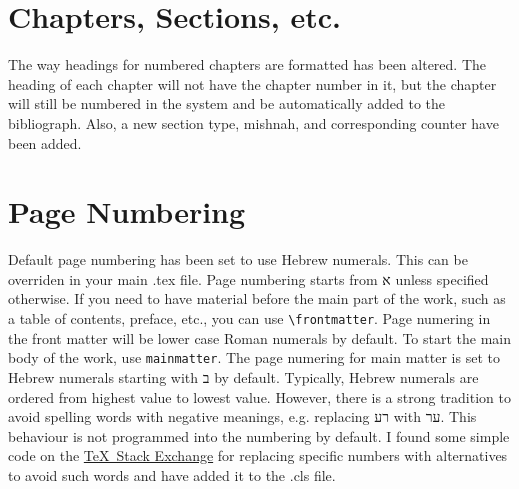 \documentclass[12pt]{article}
\begin{document}
	\section{Chapters, Sections, etc.}
	The way headings for numbered chapters are formatted has been altered. The heading of each chapter will not have the chapter number in it, but the chapter will still be numbered in the system and be automatically added to the bibliograph. Also, a new section type, mishnah, and corresponding counter have been added.
	\section{Page Numbering}
	Default page numbering has been set to use Hebrew numerals. This can be overriden in your main .tex file. Page numbering starts from \texthebrew{א} unless specified otherwise. If you need to have material before the main part of the work, such as a table of contents, preface, etc., you can use \verb|\frontmatter|. Page numering in the front matter will be lower case Roman numerals by default. To start the main body of the work, use \verb|mainmatter|. The page numering for main matter is set to Hebrew numerals starting with \texthebrew{ב} by default. Typically, Hebrew numerals are ordered from highest value to lowest value. However, there is a strong tradition to avoid spelling words with negative meanings, e.g. replacing \texthebrew{רע} with \texthebrew{ער}. This behaviour is not programmed into the numbering by default. I found some simple code on the \href{https://tex.stackexchange.com/questions/300008/modify-specific-hebrew-alpha-numerals-on-page-number}{\TeX\ Stack Exchange} for replacing specific numbers with alternatives to avoid such words and have added it to the .cls file.
\end{document}
